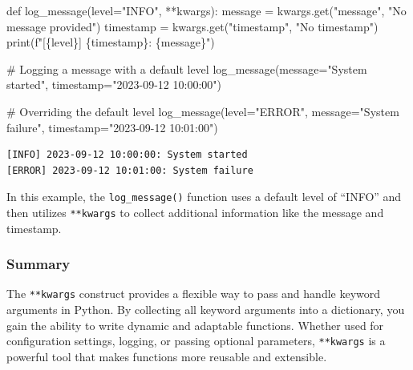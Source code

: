\documentclass[
  letterpaper,
  DIV=11,
  numbers=noendperiod]{scrreprt}
\newenvironment{Shaded}{\begin{snugshade}}{\end{snugshade}}
\newcommand{\BuiltInTok}[1]{\textcolor[rgb]{0.00,0.23,0.31}{#1}}
\newcommand{\CommentTok}[1]{\textcolor[rgb]{0.37,0.37,0.37}{#1}}
\newcommand{\KeywordTok}[1]{\textcolor[rgb]{0.00,0.23,0.31}{#1}}
\newcommand{\NormalTok}[1]{\textcolor[rgb]{0.00,0.23,0.31}{#1}}
\newcommand{\OperatorTok}[1]{\textcolor[rgb]{0.37,0.37,0.37}{#1}}
\newcommand{\SpecialCharTok}[1]{\textcolor[rgb]{0.37,0.37,0.37}{#1}}
\newcommand{\SpecialStringTok}[1]{\textcolor[rgb]{0.13,0.47,0.30}{#1}}
\newcommand{\StringTok}[1]{\textcolor[rgb]{0.13,0.47,0.30}{#1}}
\begin{document}
\begin{Shaded}
\begin{Highlighting}[]
\KeywordTok{def}\NormalTok{ log\_message(level}\OperatorTok{=}\StringTok{"INFO"}\NormalTok{, }\OperatorTok{**}\NormalTok{kwargs):}
\NormalTok{    message }\OperatorTok{=}\NormalTok{ kwargs.get(}\StringTok{"message"}\NormalTok{, }\StringTok{"No message provided"}\NormalTok{)}
\NormalTok{    timestamp }\OperatorTok{=}\NormalTok{ kwargs.get(}\StringTok{"timestamp"}\NormalTok{, }\StringTok{"No timestamp"}\NormalTok{)}
    \BuiltInTok{print}\NormalTok{(}\SpecialStringTok{f"[}\SpecialCharTok{\{}\NormalTok{level}\SpecialCharTok{\}}\SpecialStringTok{] }\SpecialCharTok{\{}\NormalTok{timestamp}\SpecialCharTok{\}}\SpecialStringTok{: }\SpecialCharTok{\{}\NormalTok{message}\SpecialCharTok{\}}\SpecialStringTok{"}\NormalTok{)}

\CommentTok{\# Logging a message with a default level}
\NormalTok{log\_message(message}\OperatorTok{=}\StringTok{"System started"}\NormalTok{, timestamp}\OperatorTok{=}\StringTok{"2023{-}09{-}12 10:00:00"}\NormalTok{)}

\CommentTok{\# Overriding the default level}
\NormalTok{log\_message(level}\OperatorTok{=}\StringTok{"ERROR"}\NormalTok{, message}\OperatorTok{=}\StringTok{"System failure"}\NormalTok{, timestamp}\OperatorTok{=}\StringTok{"2023{-}09{-}12 10:01:00"}\NormalTok{)}
\end{Highlighting}
\end{Shaded}

\begin{verbatim}
[INFO] 2023-09-12 10:00:00: System started
[ERROR] 2023-09-12 10:01:00: System failure
\end{verbatim}

In this example, the \texttt{log\_message()} function uses a default
level of ``INFO'' and then utilizes \texttt{**kwargs} to collect
additional information like the message and timestamp.

\hypertarget{summary}{%
\subsubsection{Summary}\label{summary}}

The \texttt{**kwargs} construct provides a flexible way to pass and
handle keyword arguments in Python. By collecting all keyword arguments
into a dictionary, you gain the ability to write dynamic and adaptable
functions. Whether used for configuration settings, logging, or passing
optional parameters, \texttt{**kwargs} is a powerful tool that makes
functions more reusable and extensible.
\end{document}
